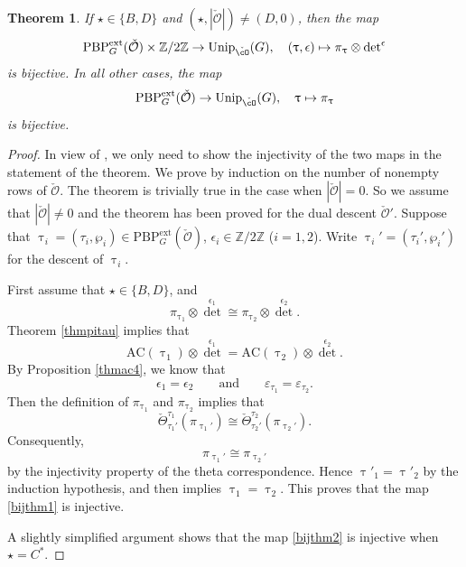 \documentclass[11pt,a4paper]{amsart}
\newcommand{\CO}{{\mathcal {O}}}
\newcommand{\Z}{\mathbb{Z}}
\newcommand{\be}{\begin {equation}}
\newcommand{\ee}{\end {equation}}
\numberwithin{equation}{section}
\newtheorem{thm}{Theorem}[section]
\theoremstyle{remark}
\def\Unip{\mathrm{Unip}}
\def\PBPe{\mathrm{PBP}^{\mathrm{ext}}}
\def\PBPeg{\mathrm{PBP}^{\mathrm{ext}}_{G}}
\begin{document}
\begin{thm}\label{thmac7}
If $\star\in \{B,D\}$ and $(\star, |\check \CO|)\neq (D, 0)$, then  the map
\be\label{bijthm1}
 \PBPe_G(\check \CO)\times \Z/2\Z \rightarrow \Unip_{\check \cO}(G),\quad (\uptau, \epsilon)\mapsto \pi_\uptau\otimes {\det}^{\epsilon}
\ee
is bijective. In all other cases, the
map
\begin{equation}\label{bijthm2}
\PBPe_G(\check \CO)\rightarrow \Unip_{\check \cO}(G), \quad \uptau\mapsto \pi_\uptau
\end{equation}
is bijective.
\end{thm}

\begin{proof}
In view of , we only need to show the injectivity of  the two maps in the statement of the theorem. We prove by induction on the number of nonempty rows of $\check \CO$. The theorem is trivially true in the case when  $|\check \CO|=0$. So we assume that $|\check \CO|\neq 0$  and the theorem has been proved for the dual descent $\check \CO'$.
Suppose that  $\uptau_i=(\tau_i, \wp_i)\in \PBPeg(\check \CO)$, $\epsilon_i\in \Z/2\Z$ ($i=1,2$). Write  $\uptau_i'=(\tau_i', \wp_i')$ for the descent of $\uptau_i$.


First assume that $\star\in \{B,D\}$, and
\[
  \pi_{\uptau_1}\otimes {\det}^{\epsilon_1}\cong \pi_{\uptau_2}\otimes {\det}^{\epsilon_2}.
\]
Theorem \ref{thmpitau} implies that
\[
\mathrm{AC}(\uptau_1)\otimes {\det}^{\epsilon_1}=\mathrm{AC}(\uptau_2)\otimes {\det}^{\epsilon_2}.
\]
By Proposition \ref{thmac4}, we know that
\[
  \epsilon_1=\epsilon_2\qquad\textrm{and}\qquad \varepsilon_{\tau_1}=\varepsilon_{\tau_2}.
\]
Then the definition of $ \pi_{\uptau_1}$ and $ \pi_{\uptau_2}$ implies that
\[
 \check  \Theta_{\tau_1'}^{\tau_1}(\pi_{\uptau_1'})\cong \check \Theta_{\tau_2'}^{\tau_2}(\pi_{\uptau_2'}).
\]
 Consequently,
\[
\pi_{\uptau_1'}\cong \pi_{\uptau_2'}
\]
by the injectivity property of the theta correspondence. Hence $\uptau'_1=\uptau'_2$ by the induction hypothesis, and  then implies $\uptau_1=\uptau_2$.
This proves that the map \eqref{bijthm1} is injective.

A slightly simplified argument shows that the map \eqref{bijthm2} is injective when $\star=C^*$.


\end{proof}
\end{document}
